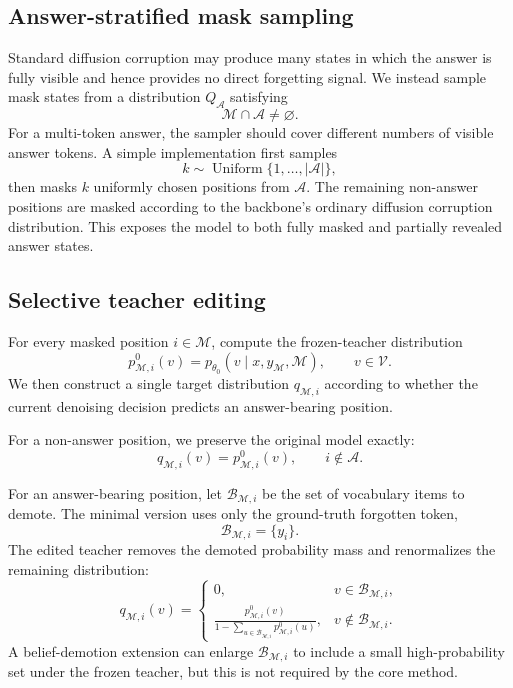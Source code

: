 \documentclass{article}
\newcommand{\V}{\mathcal{V}}
\newcommand{\Mset}{\mathcal{M}}
\newcommand{\Aset}{\mathcal{A}}
\newcommand{\Qans}{Q_{\Aset}}
\begin{document}
\subsection{Answer-stratified mask sampling}
Standard diffusion corruption may produce many states in which the answer is
fully visible and hence provides no direct forgetting signal. We instead sample
mask states from a distribution $\Qans$ satisfying
\begin{equation}
    \Mset\cap\Aset\neq\varnothing.
\end{equation}
For a multi-token answer, the sampler should cover different numbers of visible
answer tokens. A simple implementation first samples
\begin{equation}
    k \sim \operatorname{Uniform}\{1,\ldots,|\Aset|\},
\end{equation}
then masks $k$ uniformly chosen positions from $\Aset$. The remaining
non-answer positions are masked according to the backbone's ordinary diffusion
corruption distribution. This exposes the model to both fully masked and
partially revealed answer states.

\subsection{Selective teacher editing}
For every masked position $i\in\Mset$, compute the frozen-teacher distribution
\begin{equation}
    p^0_{\Mset,i}(v)
    =
    p_{\theta_0}(v\mid x,y_{\Mset},\Mset),
    \qquad v\in\V.
    \label{eq:teacher}
\end{equation}
We then construct a single target distribution $q_{\Mset,i}$ according to
whether the current denoising decision predicts an answer-bearing position.

For a non-answer position, we preserve the original model exactly:
\begin{equation}
    q_{\Mset,i}(v)=p^0_{\Mset,i}(v),
    \qquad i\notin\Aset.
    \label{eq:retain-target}
\end{equation}

For an answer-bearing position, let $\mathcal{B}_{\Mset,i}$ be the set of
vocabulary items to demote. The minimal version uses only the ground-truth
forgotten token,
\begin{equation}
    \mathcal{B}_{\Mset,i}=\{y_i\}.
    \label{eq:demote-set-minimal}
\end{equation}
The edited teacher removes the demoted probability mass and renormalizes the
remaining distribution:
\begin{equation}
q_{\Mset,i}(v)
=
\begin{cases}
0,
& v\in\mathcal{B}_{\Mset,i},\\[4pt]
\displaystyle
\frac{p^0_{\Mset,i}(v)}
{1-\sum_{u\in\mathcal{B}_{\Mset,i}}p^0_{\Mset,i}(u)},
& v\notin\mathcal{B}_{\Mset,i}.
\end{cases}
\label{eq:edited-target}
\end{equation}
A belief-demotion extension can enlarge $\mathcal{B}_{\Mset,i}$ to include a
small high-probability set under the frozen teacher, but this is not required by
the core method.
\end{document}
